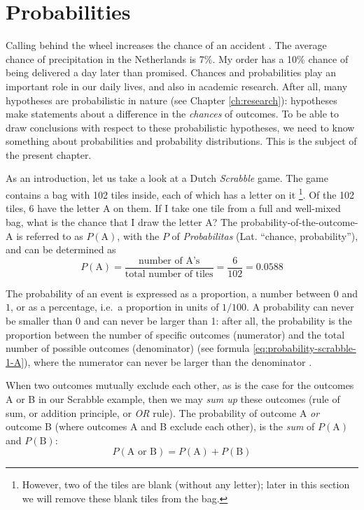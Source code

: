 \documentclass[
]{book}
\begin{document}
\hypertarget{sec:probabilities}{%
\section{Probabilities}\label{sec:probabilities}}

Calling behind the wheel increases the chance of an accident \citep{Bhar13}.
The average chance of precipitation in the Netherlands is 7\%. My order has a
10\% chance of being delivered a day later than promised. Chances and probabilities
play an important role in our daily lives, and also in academic research. After all,
many hypotheses are probabilistic in nature (see Chapter
\ref{ch:research}): hypotheses make statements about a
difference in the \emph{chances} of outcomes. To be able to draw conclusions with
respect to these probabilistic hypotheses, we need to know something about
probabilities and
probability distributions. This is the subject of the present chapter.

As an introduction, let us take a look at a Dutch \emph{Scrabble} game.
The game contains a bag with 102 tiles inside, each of which has a letter on it
\footnote{However, two of the tiles are blank (without any letter); later in this section we will remove these blank tiles from the bag.}. Of the 102 tiles, 6 have the letter A on them. If I take one tile from a
full and well-mixed bag, what is the chance that I draw the letter A? The
probability-of-the-outcome-A is referred to as \(P(\textrm{A})\), with the \(P\) of
\emph{Probabilitas} (Lat. ``chance, probability''), and can be determined as
\begin{equation}
    P(\textrm{A})=
    \frac{\textrm{number of A's}}{\textrm{total number of tiles}}= 
    \frac{6}{102} = 0.0588
  \label{eq:probability-scrabble-1-A}
\end{equation}

The probability of an event is expressed as a proportion, a number between
\(0\) and \(1\), or as a percentage, i.e.~a proportion in units of \(1/100\).
A probability can never be smaller than \(0\) and can never be larger than
1: after all, the probability is the proportion between the number
of specific outcomes (numerator) and the total number of possible outcomes
(denominator) (see
formula \eqref{eq:probability-scrabble-1-A}), where the numerator can never be larger
than the denominator \citep{SK01}.

When two outcomes mutually exclude each other, as is the case for
the outcomes A or B in our Scrabble example, then we may \emph{sum up}
these outcomes (rule of sum, or addition principle, or \emph{OR} rule).
The probability of outcome A \emph{or}
outcome B (where outcomes A and B exclude each other), is the \emph{sum}
of \(P(\textrm{A})\) and \(P(\textrm{B})\):
\begin{equation}
    P(\textrm{A or B}) = P(\textrm{A}) + P(\textrm{B})
  \label{eq:probability-sumrule}
\end{equation}
\end{document}
